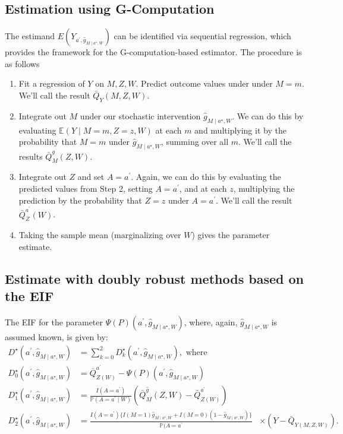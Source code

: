 \documentclass[
  12pt, krantz2,
]{book}
\providecommand{\tightlist}{%
  \setlength{\itemsep}{0pt}\setlength{\parskip}{0pt}}
\theoremstyle{definition}
\theoremstyle{definition}
\theoremstyle{definition}
\renewcommand{\P}{\mathbb{P}}
\newcommand{\E}{\mathbb{E}}
\newcommand{\1}{\mathbbm{1}}
\begin{document}
\hypertarget{estimation-using-g-computation}{%
\subsection{Estimation using G-Computation}\label{estimation-using-g-computation}}

The estimand \(E(Y_{a^\prime, \hat{g}_{M \mid a^\star,W}})\) can be identified
via sequential regression, which provides the framework for the
G-computation-based estimator. The procedure is as follows

\begin{enumerate}
\def\labelenumi{\arabic{enumi}.}
\tightlist
\item
  Fit a regression of \(Y\) on \(M,Z,W\). Predict outcome values under under
  \(M=m\). We'll call the result \(\bar{Q}_Y(M,Z,W)\).
\item
  Integrate out \(M\) under our stochastic intervention
  \(\hat{g}_{M \mid a^{\star}, W}\). We can do this by evaluating
  \(\E(Y \mid M=m,Z=z,W)\) at each \(m\) and multiplying it by the probability
  that \(M=m\) under \(\hat{g}_{M \mid a^{\star}, W}\), summing over all \(m\).
  We'll call the results \(\bar{Q}^{g}_M(Z,W)\).
\item
  Integrate out \(Z\) and set \(A=a^\prime\). Again, we can do this by evaluating
  the predicted values from Step 2, setting \(A=a^\prime\), and at each \(z\),
  multiplying the prediction by the probability that \(Z=z\) under \(A=a^\prime\).
  We'll call the result \(\bar{Q}^{a^\prime}_Z(W)\).
\item
  Taking the sample mean (marginalizing over \(W\)) gives the parameter
  estimate.
\end{enumerate}

\hypertarget{estimate-with-doubly-robust-methods-based-on-the-eif}{%
\subsection{Estimate with doubly robust methods based on the EIF}\label{estimate-with-doubly-robust-methods-based-on-the-eif}}

The EIF for the parameter \(\Psi(P)(a^{\prime}, \hat{g}_{M \mid a^{\star},W})\),
where, again, \(\hat{g}_{M \mid a^{\star}, W}\) is assumed known, is given by:
\begin{align*}
  D^{\star}(a^{\prime}, \hat{g}_{M \mid a^{\star}, W}) &= \sum_{k=0}^2
      D_k^{\star}(a^{\prime}, \hat{g}_{M \mid a^{\star}, W}), \text{ where }\\
  D^{\star}_0(a^{\prime}, \hat{g}_{M \mid a^{\star}, W}) &=
      \bar{Q}^{a^{\prime}}_{Z(W)} -
      \Psi(P)(a^{\prime}, \hat{g}_{M \mid a^{\star}, W})\\
  D^{\star}_1(a^{\prime}, \hat{g}_{M \mid a^{\star}, W}) &=
      \frac{I(A=a^{\prime})}{\P(A=a^{\prime} \mid W)}(\bar{Q}^{\hat{g}}_M(Z,W)
      - \bar{Q}^{a^{\prime}}_{Z(W)})\\
  D^{\star}_2(a^{\prime}, \hat{g}_{M \mid a^{\star}, W}) &=
      \frac{I(A=a^{\prime})\{I(M=1) \hat{g}_{M \mid a^{\star}, W} +
      I(M=0)(1-\hat{g}_{M \mid a^{\star}, W}) \}}{\P(A=a^{\prime}}
      &\times (Y-\bar{Q}_{Y(M,Z,W)}).
\end{align*}
\end{document}
